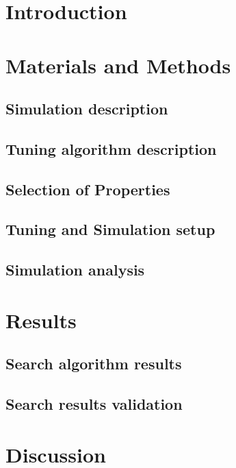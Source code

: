 \documentclass[metals,article,submit,pdftex,moreauthors]{Definitions/mdpi}
\begin{document}
\section{Introduction}
	

\section{Materials and Methods}
	\subsection{Simulation description}
	

	\subsection{Tuning algorithm description}
	

	\subsection{Selection of Properties}
	

	\subsection{Tuning and Simulation setup}
	

	\subsection{Simulation analysis}
	

\section{Results}
	\subsection{Search algorithm results}
	

	\subsection{Search results validation}
	
	\FloatBarrier

\section{Discussion}
	
\end{document}
